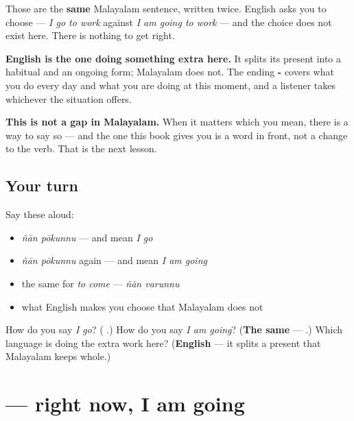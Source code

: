 Those are the \textbf{same} Malayalam sentence, written twice. English asks you to choose — \emph{I go to work} against \emph{I am going to work} — and the choice does not exist here. There is nothing to get right.

\begin{culture}
\textbf{English is the one doing something extra here.} It splits its present into a habitual and an ongoing form; Malayalam does not. The ending \textbf{-} covers what you do every day and what you are doing at this moment, and a listener takes whichever the situation offers.

\textbf{This is not a gap in Malayalam.} When it matters which you mean, there is a way to say so — and the one this book gives you is a word in front, not a change to the verb. That is the next lesson.
\end{culture}

\subsection*{Your turn}
Say these aloud:

\begin{itemize}
\raggedright
  \item \emph{ñān pōkunnu} — and mean \emph{I go}
  \item \emph{ñān pōkunnu} again — and mean \emph{I am going}
  \item the same for \emph{to come} — \emph{ñān varunnu}
  \item what English makes you choose that Malayalam does not
\end{itemize}

\begin{tcolorbox}[breakable,colback=teal!4,colframe=teal!35!black,title={Before you move on}]
How do you say \emph{I go}? (\textbf{ }.) How do you say \emph{I am going}? (\textbf{The same} —  .) Which language is doing the extra work here? (\textbf{English} — it splits a present that Malayalam keeps whole.)
\end{tcolorbox}
\section[\texorpdfstring{\ml{ഇപ്പോൾ} \ml{ഞാൻ} \ml{പോകുന്നു} (ippōḷ ñān pōkunnu)}{ഇപ്പോൾ ഞാൻ പോകുന്നു (ippōḷ ñān pōkunnu)}]{   — right now, I am going}

\label{lesson:ML-C104-ippol}



